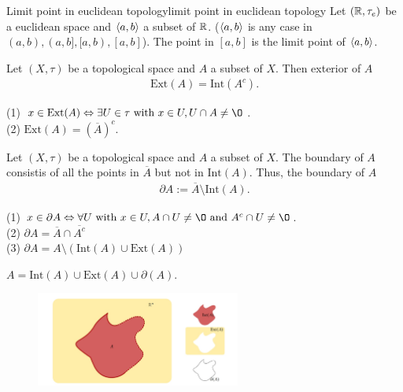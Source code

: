 \begin{example}{Limit point in euclidean topology}{limit point in euclidean topology}
    Let $(\mathbb{R},\tau_e)$ be a euclidean space and $\langle a,b\rangle$ a subset of $\mathbb{R}$. ($\langle a,b\rangle$ is any case in 
    $(a,b),(a,b],[a,b),[a,b]$). The point in $[a,b]$ is the limit point of $\langle a,b\rangle$.
\end{example}



\begin{definition}{}{}
    Let $(X,\tau)$ be a topological space and $A$ a subset of $X$. 
    Then exterior of $A$
    \begin{align*}
        \text{Ext} (A) = \text{Int}(A^c).
    \end{align*}
\end{definition}


\begin{proposition}{}{}
    (1) $x\in \text{Ext}(A) \Leftrightarrow \exists U\in \tau\text{ with } x\in U, U\cap A\neq \O$.\\
    (2) $\text{Ext}(A) = (\overline{A})^c$.
\end{proposition}

\begin{definition}{}{}
    Let $(X,\tau)$ be a topological space and $A$ a subset of $X$. 
    The boundary of $A$ consistis of all the points in $\overline{A}$ but not in $\text{Int}(A)$. 
    Thus, the boundary of $A$ 
    \begin{align*}
        \partial A:=\overline{A}\setminus \text{Int}(A).  
    \end{align*}
\end{definition}
 
\begin{proposition}{}{}
    (1) $x\in \partial A \Leftrightarrow \forall U \text{ with } x\in U, A\cap U\neq \O \text{ and } A^c\cap U\neq \O$.\\
    (2) $\partial A=\overline{A}\cap\overline{A^c}$\\
    (3) $\partial A=A\setminus (\text{Int}(A)\cup \text{Ext}(A))$
\end{proposition}


\begin{proposition}{}{}
    $A=\text{Int}(A)\cup \text{Ext}(A)\cup \partial(A)$.
\end{proposition}

\begin{figure}[htbp]
    \centering
    \includegraphics[width=0.6\textwidth]{figure/topological_space/int_ext_boundary.png}
    \caption{}
\end{figure}



